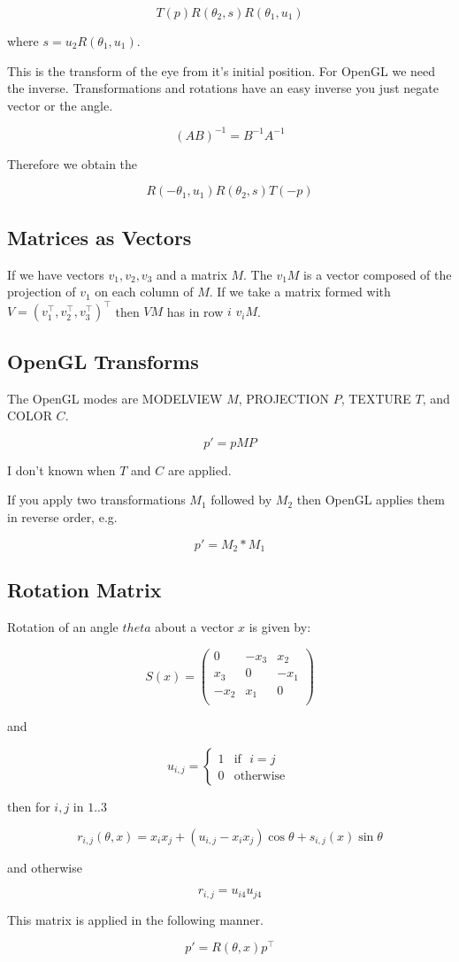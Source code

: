 \documentclass[12pt]{article}
\begin{document}
\[
  T(p) R(\theta_2, s) R(\theta_1, u_1) 
\]

where $s = u_2 R(\theta_1, u_1)$.

This is the transform of the eye from it's initial position. For
OpenGL we need the inverse. Transformations and rotations have an easy
inverse you just negate vector or the angle.

\[
   (AB)^{-1} = B^{-1} A^{-1}
\]

Therefore we obtain the 

\[
  R(-\theta_1, u_1) R(\theta_2, s) T(-p) 
\]

\subsection{Matrices as Vectors}

If we have vectors $v_1, v_2, v_3$ and a matrix $M$. The $v_1 M$ is a
vector composed of the projection of $v_1$ on each column of $M$. If
we take a matrix formed with $V = (v_1^\top, v_2^\top, v_3^\top)^\top$
then $VM$ has in row $i$ $v_iM$.


\subsection{OpenGL Transforms}

The OpenGL modes are MODELVIEW $M$, PROJECTION $P$, TEXTURE $T$, and
COLOR $C$.

\[
  p' = pMP
\]

I don't known when $T$ and $C$ are applied.

If you apply two transformations $M_1$ followed by $M_2$ then OpenGL
applies them in reverse order, e.g.

\[
  p' = M_2 * M_1
\]

\subsection{Rotation Matrix}

Rotation of an angle $theta$ about a vector $x$ is given by:

\[
  S(x) = \left ( \begin{array}{ccc}
     0    & -x_3 & x_2    \\
     x_3  & 0    & -x_1   \\
     -x_2 & x_1  & 0      \\
  \end{array} \right )
\]

and

\[ u_{i,j} = \left \{ \begin{array}{ll}
     1 & \mbox{if}\:\:\: i = j \\
     0 & \mbox{otherwise}\: 
   \end{array} \right .
\]

then for $i, j$ in $1 .. 3$

\[
  r_{i,j}(\theta, x) =
    x_i x_j + (u_{i,j} - x_ix_j)\cos \theta + s_{i,j}(x) \sin \theta
\]

and otherwise

\[
  r_{i,j} = u_{i4} u_{j4}
\]

This matrix is applied in the following manner.

\[
  p' = R(\theta, x) p^\top
\]
\end{document}
